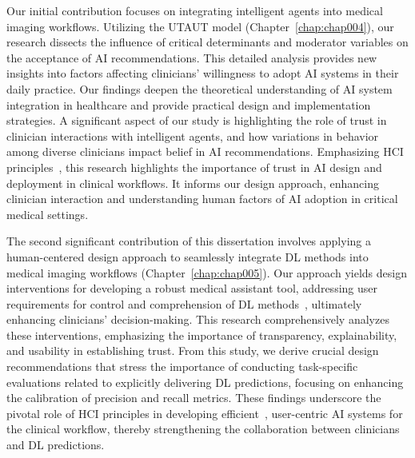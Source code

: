 \textcolor{revised}{Our initial contribution focuses on integrating intelligent agents into medical imaging workflows.
Utilizing the \ac{UTAUT} model (Chapter~\ref{chap:chap004}), our research dissects the influence of critical determinants and moderator variables on the acceptance of \ac{AI} recommendations.
This detailed analysis provides new insights into factors affecting clinicians' willingness to adopt \ac{AI} systems in their daily practice.
Our findings deepen the theoretical understanding of \ac{AI} system integration in healthcare and provide practical design and implementation strategies.
A significant aspect of our study is highlighting the role of trust in clinician interactions with intelligent agents, and how variations in behavior among diverse clinicians impact belief in \ac{AI} recommendations.
Emphasizing \ac{HCI} principles~\cite{10.1145/3479587}, this research highlights the importance of trust in \ac{AI} design and deployment in clinical workflows.
It informs our design approach, enhancing clinician interaction and understanding human factors of \ac{AI} adoption in critical medical settings.}

\textcolor{revised}{The second significant contribution of this dissertation involves applying a human-centered design approach to seamlessly integrate \ac{DL} methods into medical imaging workflows (Chapter~\ref{chap:chap005}).
Our approach yields design interventions for developing a robust medical assistant tool, addressing user requirements for control and comprehension of \ac{DL} methods~\cite{10.1145/3538882.3542790}, ultimately enhancing clinicians' decision-making.
This research comprehensively analyzes these interventions, emphasizing the importance of transparency, explainability, and usability in establishing trust.
From this study, we derive crucial design recommendations that stress the importance of conducting task-specific evaluations related to explicitly delivering \ac{DL} predictions, focusing on enhancing the calibration of precision and recall metrics.
These findings underscore the pivotal role of \ac{HCI} principles in developing efficient~\cite{10.1145/3290605.3300233}, user-centric \ac{AI} systems for the clinical workflow, thereby strengthening the collaboration between clinicians and \ac{DL} predictions.}

